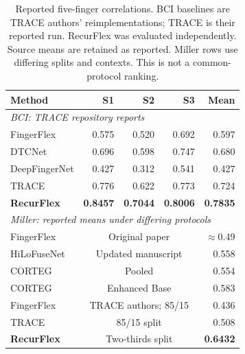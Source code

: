 \begin{table}[t]
\caption{Reported five-finger correlations. BCI baselines are TRACE authors' reimplementations; TRACE is their reported run. RecurFlex was evaluated independently. Source means are retained as reported. Miller rows use differing splits and contexts. This is not a common-protocol ranking.}
\label{tab:literature}
\centering
\footnotesize
\begin{tabular}{lrrrr}
\toprule
Method & S1 & S2 & S3 & Mean\\
\midrule
\multicolumn{5}{l}{\emph{BCI: TRACE repository reports}~\cite{trace2026}}\\
FingerFlex & 0.575 & 0.520 & 0.692 & 0.597\\
DTCNet & 0.696 & 0.598 & 0.747 & 0.680\\
DeepFingerNet & 0.427 & 0.312 & 0.541 & 0.427\\
TRACE & 0.776 & 0.622 & 0.773 & 0.724\\
\textbf{RecurFlex} & \textbf{0.8457} & \textbf{0.7044} & \textbf{0.8006} & \textbf{0.7835}\\
\midrule
\multicolumn{5}{l}{\emph{Miller: reported means under differing protocols}}\\
FingerFlex~\cite{fingerflex} & \multicolumn{3}{c}{Original paper} & $\approx$0.49\\
HiLoFuseNet~\cite{hilofusenet} & \multicolumn{3}{c}{Updated manuscript} & 0.558\\
CORTEG~\cite{corteg} & \multicolumn{3}{c}{Pooled} & 0.554\\
CORTEG~\cite{corteg} & \multicolumn{3}{c}{Enhanced Base} & 0.583\\
FingerFlex~\cite{trace2026} & \multicolumn{3}{c}{TRACE authors; 85/15} & 0.436\\
TRACE~\cite{trace2026} & \multicolumn{3}{c}{85/15 split} & 0.508\\
\textbf{RecurFlex} & \multicolumn{3}{c}{Two-thirds split} & \textbf{0.6432}\\
\bottomrule
\end{tabular}
\end{table}
